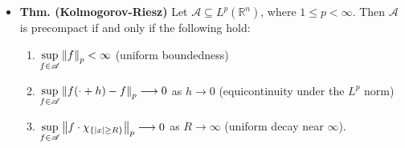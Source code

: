 \documentclass{article}
\begin{document}
\begin{itemize}
\begin{solutions}
\begin{enumerate}[itemsep =-2pt,label = (\arabic{*})]
\begin{align}
				\begin{split}
					\norm{f_{\epsilon} - f}_{p}^{p} &= \int \abs{\int [f(x -y) - f(x)]\rho_{\epsilon}(y)\;dy}^{p}\;dx \\ 
					&\leq \int \left(\int \abs{f(x -y) - f(x)}\rho_{\epsilon}(y)\;dy\right)^{p}\;dx \\
					&\leq \left[\int \left[\int |f(x - y)- f(x)|^{p}\rho_{\epsilon}^{p}(y)\;dx\right]^{1/p}dy\right]^{p} \\
					&= \left[\int \left[\int |f(x - y) - f(x)|^{p}\;dx\right]^{1/p}\rho_{\epsilon}(y)\;dy\right]^{p} \\
					&\leq \left[\int 2\norm{f}_{p}\rho_{\epsilon}(y)\;dy\right]^{p} \\
					\implies 
					\norm{f_{\epsilon} - f}_{p} & \leq \int 2\norm{f}_{p} \rho_{\epsilon}(y)\;dy. 
				\end{split}
			\end{align}
			Now we note that $2\norm{f}_{p}\rho_{\epsilon}(y) \to 0$ a.e. and $2\norm{f}_{p}\rho_{\epsilon}(y) \leq 2\norm{f}_{p}\norm{\rho}_{\infty}\chi_{B_{R}(0)} \in L^{1}$ (as in the proof of (1)). Hence, by the Dominated Convergence Theorem, we conclude that $\lim_{\epsilon \to 0}\norm{f_{\epsilon} - f}_{p} = 0$. 
		\end{enumerate}
	\end{solutions}
	
	\item \textbf{Thm. (Kolmogorov-Riesz)} Let $\mathscr{A} \subseteq L^{p}(\mathbb{R}^{n})$, where $1 \leq p < \infty$. Then $\mathscr{A}$ is precompact if and only if the following hold: \vspace{-0.15cm}
	\begin{enumerate}[itemsep =-2pt,label = (\arabic{*})]
		\item $\sup\limits_{f \in \mathscr{A}}\left\Vert f \right\Vert_{p} < \infty$ (uniform boundedness) 
		\item $\sup\limits_{f \in \mathscr{A}}\left\Vert f(\cdot + h) - f \right\Vert_{p} \longrightarrow 0$ as $h \to 0$ (equicontinuity under the $L^{p}$ norm)
		\item $\sup\limits_{f \in \mathscr{A}}\left\Vert f \cdot \chi_{\{|x|\geq R\}} \right\Vert_{p} \longrightarrow 0$ as $R \to \infty$ (uniform decay near $\infty$).
	\end{enumerate}
	

\end{itemize}
\end{document}
